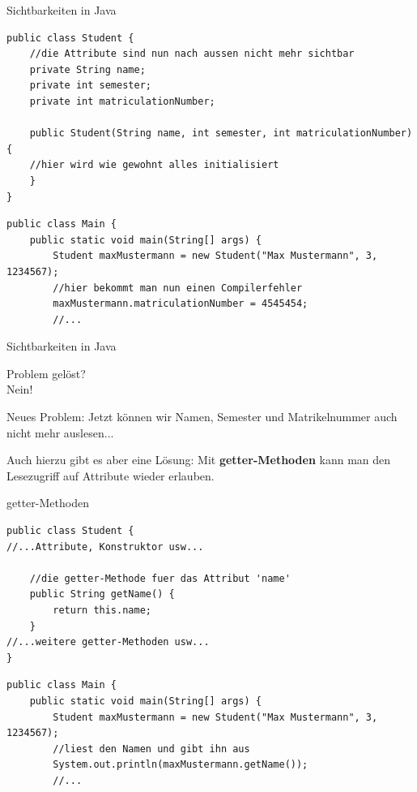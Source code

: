 \documentclass[18pt]{beamer}
\begin{document}
\begin{frame}[containsverbatim]{Sichtbarkeiten in Java}
\begin{lstlisting}
public class Student {
	//die Attribute sind nun nach aussen nicht mehr sichtbar
	private String name;
	private int semester;
	private int matriculationNumber;

	public Student(String name, int semester, int matriculationNumber) {
	//hier wird wie gewohnt alles initialisiert
	}	
}
\end{lstlisting}
\begin{lstlisting}
public class Main {
	public static void main(String[] args) {
		Student maxMustermann = new Student("Max Mustermann", 3, 1234567);
		//hier bekommt man nun einen Compilerfehler
		maxMustermann.matriculationNumber = 4545454;
		//...
\end{lstlisting}
\end{frame}

\begin{frame}{Sichtbarkeiten in Java}
\begin{center}{\huge Problem gelöst?\\}
\pause
{\Huge Nein!}
\end{center}
\pause
\begin{alertblock}{Neues Problem:}
Jetzt können wir Namen, Semester und Matrikelnummer auch nicht mehr auslesen...
\end{alertblock}
\pause
\begin{block}{Auch hierzu gibt es aber eine Lösung:}
Mit \textbf{getter-Methoden} kann man den Lesezugriff auf Attribute wieder erlauben.
\end{block}
\end{frame}

\begin{frame}[containsverbatim]{getter-Methoden}
\begin{lstlisting}
public class Student {
//...Attribute, Konstruktor usw...
	
	//die getter-Methode fuer das Attribut 'name'
	public String getName() {
		return this.name;
	}
//...weitere getter-Methoden usw...
}
\end{lstlisting}
\begin{lstlisting}
public class Main {
	public static void main(String[] args) {
		Student maxMustermann = new Student("Max Mustermann", 3, 1234567);
		//liest den Namen und gibt ihn aus
		System.out.println(maxMustermann.getName());
		//...
\end{lstlisting}
\end{frame}
\end{document}
